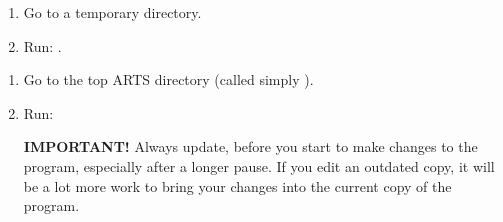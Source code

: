 \begin{enumerate}
\item Go to a temporary directory.
\item Run: .
\end{enumerate}


\begin{enumerate}
\item Go to the top ARTS directory (called simply ).
\item Run: 
   
  \textbf{IMPORTANT!} Always update, before you start to make changes
  to the program, especially after a longer pause. If you edit an
  outdated copy, it will be a lot more work to bring your changes into
  the current copy of the program.
\end{enumerate}


